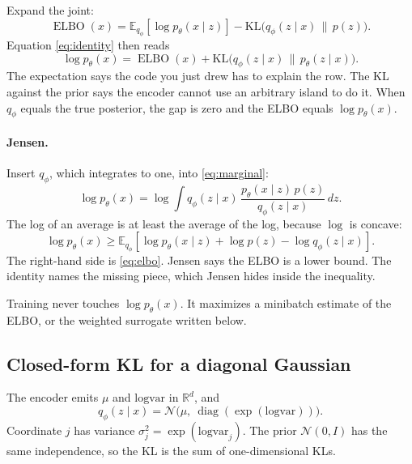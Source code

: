 \documentclass[11pt]{article}
\begin{document}
Expand the joint:
\begin{equation}
\label{eq:elbo}
\operatorname{ELBO}(x)
= \mathbb{E}_{q_{\phi}}[\log p_{\theta}(x\mid z)]
 - \mathrm{KL}\!\big(q_{\phi}(z\mid x)\,\|\,p(z)\big).
\end{equation}
Equation \eqref{eq:identity} then reads
\[
\log p_{\theta}(x)
= \operatorname{ELBO}(x)
+ \mathrm{KL}\!\big(q_{\phi}(z\mid x)\,\|\,p_{\theta}(z\mid x)\big).
\]
The expectation says the code you just drew has to explain the row.
The KL against the prior says the encoder cannot use an arbitrary island
to do it. When $q_{\phi}$ equals the true posterior, the gap is zero and
the ELBO equals $\log p_{\theta}(x)$.

\paragraph{Jensen.}
Insert $q_{\phi}$, which integrates to one, into \eqref{eq:marginal}:
\[
\log p_{\theta}(x)
= \log \int q_{\phi}(z\mid x)\,
  \frac{p_{\theta}(x\mid z)\,p(z)}{q_{\phi}(z\mid x)}\, dz.
\]
The log of an average is at least the average of the log, because
$\log$ is concave:
\begin{equation}
\label{eq:jensen}
\log p_{\theta}(x)
\ge
\mathbb{E}_{q_{\phi}}\!\left[
\log p_{\theta}(x\mid z)+\log p(z)-\log q_{\phi}(z\mid x)
\right].
\end{equation}
The right-hand side is \eqref{eq:elbo}. Jensen says the ELBO is a lower
bound. The identity names the missing piece, which Jensen hides inside
the inequality.

Training never touches $\log p_{\theta}(x)$. It maximizes a minibatch
estimate of the ELBO, or the weighted surrogate written below.

\subsection{Closed-form KL for a diagonal Gaussian}
\label{sec:kl}

The encoder emits $\mu$ and $\mathrm{logvar}$ in $\mathbb{R}^{d}$, and
\[
q_{\phi}(z\mid x)
= \mathcal{N}\!\big(\mu,\ \operatorname{diag}(\exp(\mathrm{logvar}))\big).
\]
Coordinate $j$ has variance $\sigma_{j}^{2}=\exp(\mathrm{logvar}_{j})$.
The prior $\mathcal{N}(0,I)$ has the same independence, so the KL is the
sum of one-dimensional KLs.
\end{document}
